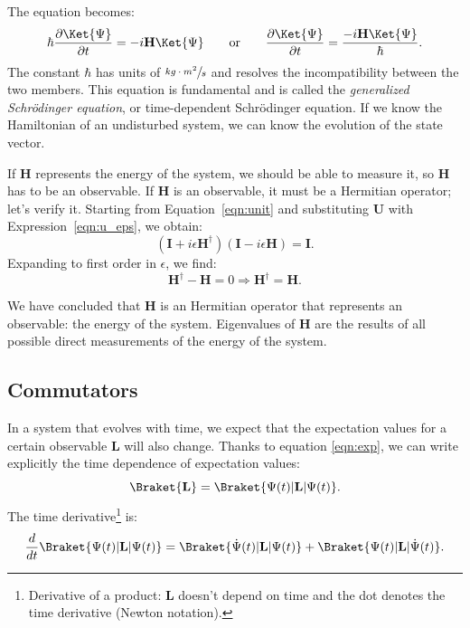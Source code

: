 The equation becomes:
\begin{equation}
	\label{eqn:shro}
	\hbar\frac{\partial\Ket{\Psi}}{\partial t} = - i \mathbf{H}\Ket{\Psi}
	\qquad \text{or} \qquad
	\frac{\partial\Ket{\Psi}}{\partial t} = \frac{- i \mathbf{H}\Ket{\Psi}}{\hbar}.
\end{equation}
The constant $\hbar$ has units of $\sfrac{kg\cdot m^2}{s}$ and resolves the incompatibility between the two members. This equation is fundamental and is called the \emph{generalized Schrödinger equation}, or time-dependent Schrödinger equation. If we know the Hamiltonian of an undisturbed system, we can know the evolution of the state vector.

If $\mathbf{H}$ represents the energy of the system, we should be able to measure it, so $\mathbf{H}$ has to be an observable. If $\mathbf{H}$ is an observable, it must be a Hermitian operator; let's verify it. Starting from Equation~\ref{eqn:unit} and substituting $\mathbf{U}$ with Expression~\ref{eqn:u_eps}, we obtain:
\[
(\mathbf{I} + i\epsilon\mathbf{H}^\dagger) (\mathbf{I} - i\epsilon\mathbf{H}) = \mathbf{I}.
\]
Expanding to first order in $\epsilon$, we find:
\[
\mathbf{H}^\dagger - \mathbf{H} = 0 \Rightarrow \mathbf{H}^\dagger = \mathbf{H}.
\]

We have concluded that $\mathbf{H}$ is an Hermitian operator that represents an observable: the energy of the system. Eigenvalues of $\mathbf{H}$ are the results of all possible direct measurements of the energy of the system. 

\subsection{Commutators}
In a system that evolves with time, we expect that the expectation values for a certain observable $\mathbf{L}$ will also change. Thanks to equation \vref{eqn:exp}, we can write explicitly the time dependence of expectation values:
\[
\Braket{\mathbf{L}} = \Braket{\Psi(t)|\mathbf{L}|\Psi(t)}.
\]
The time derivative\footnote{Derivative of a product: $\mathbf{L}$ doesn't depend on time and the dot denotes the time derivative (Newton notation).} is:
\[
\frac{d}{dt}\Braket{\Psi(t)|\mathbf{L}|\Psi(t)} = \Braket{\dot{\Psi}(t)|\mathbf{L}|\Psi(t)} + \Braket{\Psi(t)|\mathbf{L}|\dot{\Psi}(t)}.
\]

